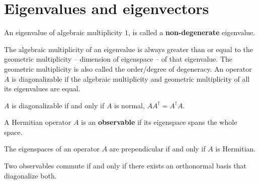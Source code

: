 \section{Eigenvalues and eigenvectors}
An eigenvalue of algebraic multiplicity \(1\), is called a \textbf{non-degenerate} eigenvalue.

The algebraic multiplicity of an eigenvalue is always greater than or equal to the geometric multiplicity -- dimension of eigenspace -- of that eigenvalue. The geometric multiplicity is also called the order/degree of degeneracy. An operator \(A\) is diagonalizable if the algebraic multiplicity and geometric multiplicity of all its eigenvalues are equal.
\begin{theorem}
    \(A\) is diagonalizable if and only if \(A\) is normal, \(AA^{\dagger} = A^{\dagger} A\).
\end{theorem}

A Hermitian operator \(A\) is an \textbf{observable} if its eigenspace spans the whole space.
\begin{theorem}
    The eigenspaces of an operator \(A\) are prependicular if and only if \(A\) is Hermitian.
\end{theorem}

\begin{theorem}
    Two observables commute if and only if there exists an orthonormal basis that diagonalize both.
\end{theorem}

